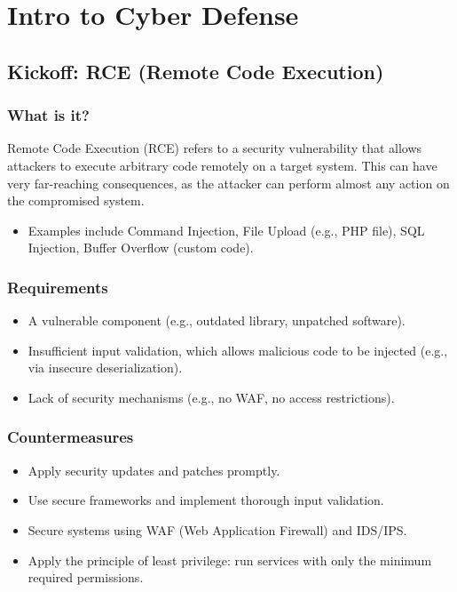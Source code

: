 \chapter{Intro to Cyber Defense}
\newpage

\section*{Kickoff: RCE (Remote Code Execution)}
\subsection*{What is it?}
Remote Code Execution (RCE) refers to a security vulnerability that allows attackers to execute arbitrary code remotely on a target system. This can have very far-reaching consequences, as the attacker can perform almost any action on the compromised system.

\begin{itemize}
    \item Examples include Command Injection, File Upload (e.g., PHP file), SQL Injection, Buffer Overflow (custom code).
\end{itemize}

\subsection*{Requirements}
\begin{itemize}
    \item A vulnerable component (e.g., outdated library, unpatched software).
    \item Insufficient input validation, which allows malicious code to be injected (e.g., via insecure deserialization).
    \item Lack of security mechanisms (e.g., no WAF, no access restrictions).
\end{itemize}

\subsection*{Countermeasures}
\begin{itemize}
    \item Apply security updates and patches promptly.
    \item Use secure frameworks and implement thorough input validation.
    \item Secure systems using WAF (Web Application Firewall) and IDS/IPS.
    \item Apply the principle of least privilege: run services with only the minimum required permissions.
\end{itemize}

